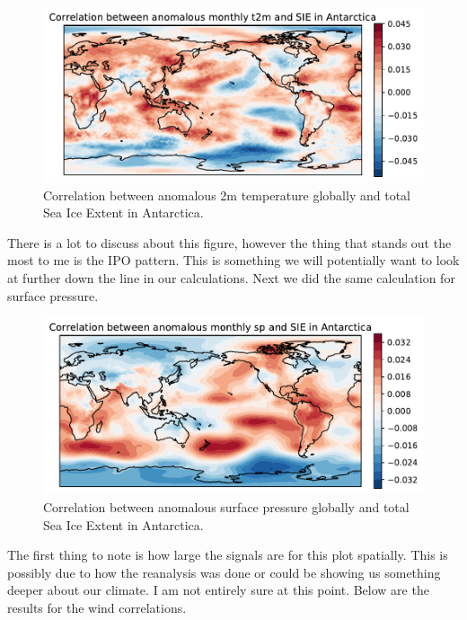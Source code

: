 \begin{figure}[H]
    \centering
    \includegraphics[width=\textwidth]{Images/global_correlation_anomalous_monthly_t2m_sie.pdf}
    \caption{Correlation between anomalous 2m temperature globally and total Sea Ice Extent in Antarctica.}
    \label{fig:t2m_anomalous_sie_corr}
\end{figure}

There is a lot to discuss about this figure, however the thing that stands out the most to me is the IPO pattern. This is something we will potentially want to look at further down the line in our calculations. Next we did the same calculation for surface pressure.

\begin{figure}[H]
    \centering
    \includegraphics[width=\textwidth]{Images/global_correlation_anomalous_monthly_sp_sie.pdf}
    \caption{Correlation between anomalous surface pressure globally and total Sea Ice Extent in Antarctica.}
    \label{fig:sp_anomalous_sie_corr}
\end{figure}
The first thing to note is how large the signals are for this plot spatially. This is possibly due to how the reanalysis was done or could be showing us something deeper about our climate. I am not entirely sure at this point. Below are the results for the wind correlations.


